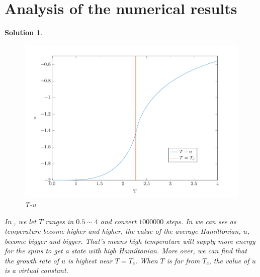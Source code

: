 \documentclass[11pt,openany]{book}              %
\newtheorem{solution}{Solution}
\begin{document}
\section{Analysis of the numerical results}
\begin{solution}
	\begin{figure}
		\centering
		\includegraphics[width=\linewidth]{figs/Tu.pdf}
		\caption{T-u}\label{fig:Tu}
	\end{figure}
	In , we let \(T\) ranges in \(0.5\sim 4\) and convert \(1000000\) steps.
	In  we can see as temperature become higher and higher, the value of the average Hamiltonian, \(u\), become bigger and bigger.
	That's means high temperature will supply more energy for the spins to get a state with high Hamiltonian.
	More over, we can find that the growth rate of \(u\) is highest near \(T=T_c\).
	When \(T\) is far from \(T_c\), the value of \(u\) is a virtual constant.


\end{solution}
\end{document}
